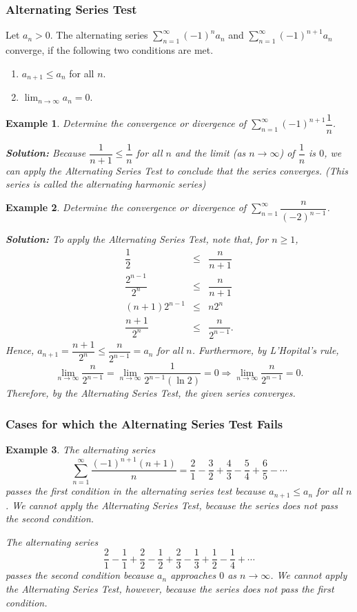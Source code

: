 \documentclass[titlepage,a4paper,12pt]{report}
\newtheorem{example}{Example}[section]
\begin{document}
\subsubsection{Alternating Series Test}
Let $a_n>0$. The alternating series $\displaystyle \sum _{n=1}^\infty (-1)^na_n$ and $\displaystyle \sum _{n=1}^\infty (-1)^{n+1}a_n$ converge, if the following two conditions are met. 
\begin{enumerate}
\item $a_{n+1}\leq a_n$ for all $n$.
\item $\displaystyle \lim _{n\rightarrow \infty} a_n =0$.
\end{enumerate}
\begin{example}
Determine the convergence or divergence of $\displaystyle \sum _{n=1}^\infty (-1)^{n+1}\dfrac{1}{n}$.

\noindent \textbf{Solution:} Because $\dfrac{1}{n+1}\leq \dfrac{1}{n}$ for all $n$ and the limit (as $n\rightarrow \infty$) of $\dfrac{1}{n}$ is $0$, we can apply the Alternating Series Test to conclude that the series converges.  (This series is called the alternating harmonic series)
\end{example} 
\begin{example}
Determine the convergence or divergence of $\displaystyle \sum _{n=1}^\infty \dfrac{n}{(-2)^{n-1}}$.

\noindent \textbf{Solution:} To apply the Alternating Series Test, note that, for $n\geq 1$, 
\begin{eqnarray*}
\dfrac{1}{2}&\leq & \dfrac{n}{n+1}\\
\dfrac{2^{n-1}}{2^n} & \leq & \dfrac{n}{n+1} \\
(n+1)2^{n-1} &\leq & n2^n \\
\dfrac{n+1}{2^n} & \leq & \dfrac{n}{2^{n-1}}.
\end{eqnarray*}
Hence, $a_{n+1}=\dfrac{n+1}{2^{n}}\leq \dfrac{n}{2^{n-1}}=a_n$ for all $n$. Furthermore, by L'Hopital's rule, 
\[\lim_{n\rightarrow \infty}\dfrac{n}{2^{n-1}}=\lim _{n\rightarrow \infty}\dfrac{1}{2^{n-1}(\ln 2)}=0\Longrightarrow \lim _{n\rightarrow \infty} \dfrac{n}{2^{n-1}}=0.\] Therefore, by the Alternating Series Test, the given series converges. 
\end{example}
\subsubsection{Cases for which the Alternating Series Test Fails}
\begin{example}
The alternating series 
\[\sum _{n=1}^\infty \dfrac{(-1)^{n+1}(n+1)}{n}=\dfrac{2}{1}-\dfrac{3}{2}+\dfrac{4}{3}-\dfrac{5}{4}+\dfrac{6}{5}-\cdots\] passes the first condition in the alternating series test because $a_{n+1}\leq a_n$ for all $n$. We cannot apply the Alternating Series Test, because the series does not  pass the second condition.

\noindent The alternating series 
\[\dfrac{2}{1}-\dfrac{1}{1}+\dfrac{2}{2}-\dfrac{1}{2}+\dfrac{2}{3}-\dfrac{1}{3}
+\dfrac{1}{2}-\dfrac{1}{4}+\cdots\] passes the second condition because $a_n$ approaches $0$ as $n\rightarrow \infty$. We cannot apply the Alternating Series Test, however, because the series does not pass the first condition.
\end{example}
\end{document}
